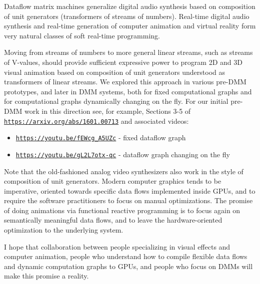 \documentclass{article}
\begin{document}
Dataflow matrix machines generalize digital audio synthesis based on composition of unit generators
(transformers of streams of numbers). Real-time digital audio synthesis and real-time generation
of computer animation and virtual reality form very natural classes of soft real-time programming.

Moving from streams of numbers to more general linear streams, such as streams of V-values,
should provide sufficient expressive power to program 2D and 3D visual animation based on
composition of unit generators understood as transformers of linear streams. We explored
this approach in various pre-DMM prototypes, and later in DMM systems, both for fixed
computational graphs and for computational graphs dynamically changing on the fly.
For our initial pre-DMM work in this direction see, for example, Sections 3-5 of \href{https://arxiv.org/abs/1601.00713}{\tt https://arxiv.org/abs/1601.00713} and associated videos:

\begin{itemize}
   \item \href{https://youtu.be/fEWcg_A5UZc}{\tt https://youtu.be/fEWcg\_A5UZc} - fixed dataflow graph
   \item \href{https://youtu.be/gL2L7otx-qc}{\tt https://youtu.be/gL2L7otx-qc} - dataflow graph changing on the fly 
\end{itemize}


Note that the old-fashioned
analog video synthesizers also work in the style of composition of unit
generators. Modern computer graphics tends to be imperative, oriented towards
specific data flows implemented inside GPUs, and to require the software practitioners to
focus on manual optimizations. The promise of doing animations via functional reactive
programming is to focus again on semantically meaningful
data flows, and to leave the hardware-oriented optimization to the underlying system.

I hope that collaboration between people specializing in visual effects and computer animation,
people who understand how to compile flexible data flows and dynamic computation graphs to GPUs,
and people who focus on DMMs will make this promise a reality.
\end{document}
